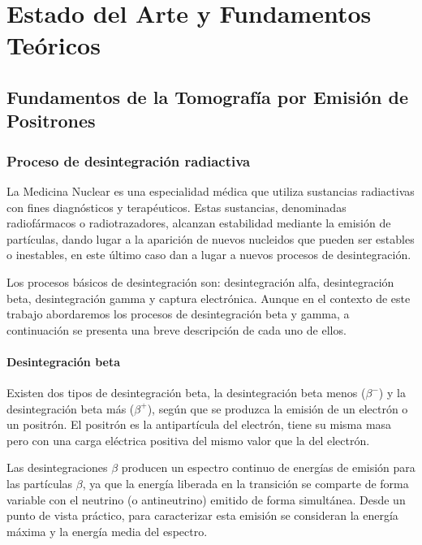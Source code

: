 \chapter{Estado del Arte y Fundamentos Teóricos}
\label{cap:estado_del_arte_fund_teoricos}

\section{Fundamentos de la Tomografía por Emisión de Positrones}
\label{sec:estado_del_arte_fund_teoricos:fundamentos_PET}

\subsection{Proceso de desintegración radiactiva}
La Medicina Nuclear es una especialidad médica que utiliza sustancias radiactivas con fines diagnósticos y terapéuticos. Estas sustancias, denominadas radiofármacos o radiotrazadores, alcanzan estabilidad mediante la emisión de partículas, dando lugar a la aparición de nuevos nucleidos que pueden ser estables o inestables, en este último caso dan a lugar a nuevos procesos de desintegración.

Los procesos básicos de desintegración son: desintegración alfa, desintegración beta, desintegración gamma y captura electrónica. Aunque en el contexto de este trabajo abordaremos los procesos de desintegración beta y gamma, a continuación se presenta una breve descripción de cada uno de ellos.

\subsubsection{Desintegración beta}

Existen dos tipos de desintegración beta, la desintegración beta menos ($\beta^{-}$) y la desintegración beta más ($\beta^{+}$), según que se produzca la emisión de un electrón o un positrón. El positrón es la antipartícula del electrón, tiene su misma masa pero con una carga eléctrica positiva del mismo valor que la del electrón.

Las desintegraciones $\beta$ producen un espectro continuo de energías de emisión para las partículas $\beta$, ya que la energía liberada en la transición se comparte de forma variable con el neutrino (o antineutrino) emitido de forma simultánea. Desde un punto de vista práctico, para caracterizar esta emisión se consideran la energía máxima y la energía media del espectro.

